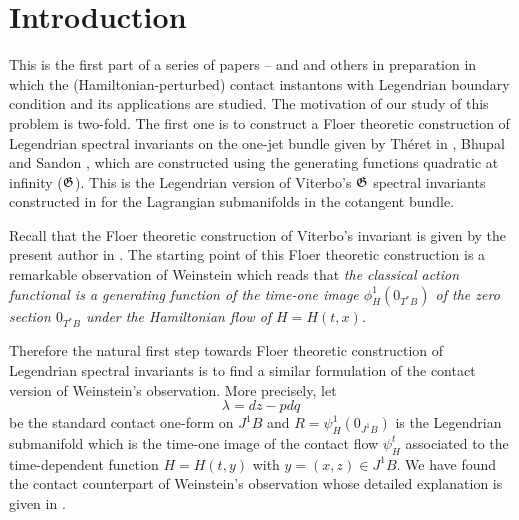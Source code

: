 \documentclass[reqno]{amsart}
\theoremstyle{theorem}
\theoremstyle{definition}
\numberwithin{equation}{section}
\def\GFQI{\frak{G}}
\begin{document}

\maketitle


\tableofcontents

\section{Introduction}

This is the first part of a series of papers \cite{oh:entanglement1}--\cite{oh:contacton-gluing}
and \cite{oh-yso:spectral} and others in preparation
in which the (Hamiltonian-perturbed) contact instantons with Legendrian boundary condition and its
applications are studied. The motivation of our study of this problem is two-fold.
The first one is to construct a Floer theoretic
construction of Legendrian spectral invariants on the one-jet bundle given by
Th\'eret in \cite{theret}, Bhupal \cite{bhupal} and Sandon \cite{sandon:homology},
which are constructed using the generating functions quadratic at infinity ($\GFQI$).
This is the Legendrian version of Viterbo's $\GFQI$ spectral invariants
constructed in \cite{viterbo:generating} for the Lagrangian submanifolds in the cotangent bundle.

Recall that the Floer theoretic construction of Viterbo's invariant is given
by the present author in \cite{oh:jdg,oh:cag}. The starting point of
this Floer theoretic construction is a remarkable
observation of Weinstein \cite{alan:observation} which reads that \emph{the classical action functional
is a generating function of
the time-one image $\phi_H^1(0_{T^*B})$ of the zero section $0_{T^*B}$ under the Hamiltonian flow of $H = H(t,x)$.}

Therefore the natural first step towards Floer theoretic construction of Legendrian spectral invariants
is to find a similar formulation
of the contact version of Weinstein's observation. More precisely, let
$$
\lambda = dz - pdq
$$
be the standard contact one-form on $J^1B$ and $R = \psi_H^1(0_{J^1B})$ is the
Legendrian submanifold which is the time-one image of the contact flow $\psi_H^t$
associated to the time-dependent function $H = H(t,y)$ with $y = (x,z) \in J^1B$.
We have found the contact counterpart of Weinstein's observation whose detailed
explanation is given in \cite{oh-yso:weinstein}.
\end{document}
